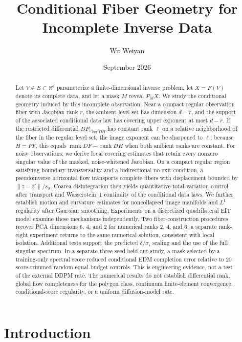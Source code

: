 \documentclass[11pt]{article}
\title{Conditional Fiber Geometry for Incomplete Inverse Data}
\author{Wu Weiyan}
\date{September 2026}
\theoremstyle{definition}
\newcommand{\R}{\mathbb R}
\newcommand{\rank}{\operatorname{rank}}
\begin{document}
\maketitle

\begin{abstract}
Let $V\in E\subset\R^d$ parameterize a finite-dimensional inverse problem,
let $X=F(V)$ denote its complete data, and let a mask $M$ reveal $P_MX$.
We study the conditional geometry induced by this incomplete observation.
Near a compact regular observation fiber with Jacobian rank $r$, the ambient
level set has dimension $d-r$, and the support of the associated conditional
data law has covering upper exponent at most $d-r$.  If the restricted
differential $DF|_{\ker DH}$ has constant rank $\ell$ on a relative
neighborhood of the fiber in the regular level set, the image exponent can be
sharpened to $\ell$; because $H=PF$, this equals
$\rank DF-\rank DH$ when both ambient ranks are constant.  For noisy observations,
we derive local covering estimates that retain every nonzero singular value
of the masked, noise-whitened Jacobian.  On a compact regular region satisfying
boundary transversality and a bidirectional no-exit condition, a pseudoinverse
horizontal flow transports complete fibers with displacement bounded by
$\|z-z'\|/s_0$.  Coarea disintegration then yields quantitative
total-variation control after transport and Wasserstein--1 continuity of the
conditional data laws.  We further establish motion and curvature estimates
for noncollapsed image manifolds and $L^1$ regularity after Gaussian
smoothing.  Experiments on a discretized quadrilateral EIT model examine these
mechanisms independently.  Two fiber-construction procedures recover PCA
dimensions $6$, $4$, and $2$ for numerical ranks $2$, $4$, and $6$; a separate
rank-eight experiment returns to the same numerical solution, consistent with
local isolation.  Additional tests
support the predicted $\delta/\sigma_i$ scaling and the use of the full
singular spectrum.  In a separate three-seed held-out study, a mask selected
by a training-only spectral score reduced conditional EDM completion error
relative to 20 score-trimmed random equal-budget controls.  This is engineering
evidence, not a
test of the external DDPM rate.  The numerical results do not establish
differential rank, global flow completeness for the polygon class, continuum
finite-element convergence, conditional-score regularity, or a uniform
diffusion-model rate.
\end{abstract}

\section{Introduction}
\end{document}
